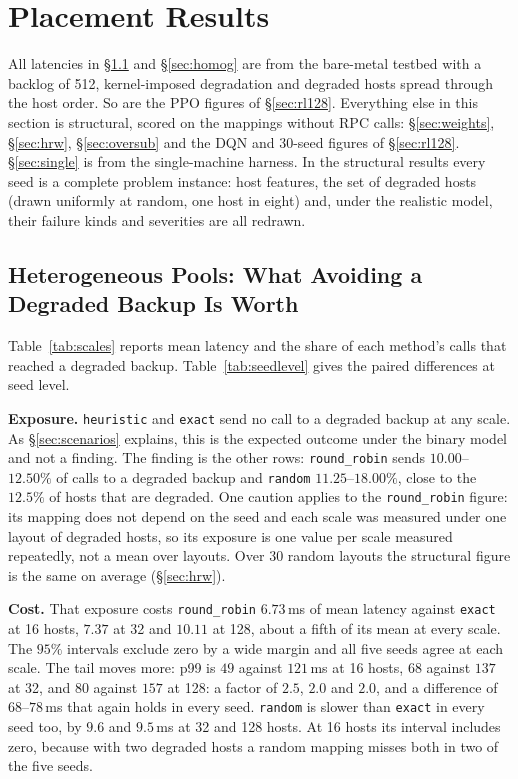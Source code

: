 \section{Placement Results}
\label{sec:results}

All latencies in \S\ref{sec:hetero} and \S\ref{sec:homog} are from the
bare-metal testbed with a backlog of 512, kernel-imposed degradation and
degraded hosts spread through the host order. So are the PPO figures of
\S\ref{sec:rl128}. Everything else in this section is structural, scored on
the mappings without RPC calls: \S\ref{sec:weights}, \S\ref{sec:hrw},
\S\ref{sec:oversub} and the DQN and 30-seed figures of \S\ref{sec:rl128}.
\S\ref{sec:single} is from the single-machine harness. In the structural
results every seed is a complete problem instance: host features, the set of
degraded hosts (drawn uniformly at random, one host in eight) and, under the
realistic model, their failure kinds and severities are all redrawn.

\subsection{Heterogeneous Pools: What Avoiding a Degraded Backup Is Worth}
\label{sec:hetero}





Table~\ref{tab:scales} reports mean latency and the share of each method's calls
that reached a degraded backup. Table~\ref{tab:seedlevel} gives the paired
differences at seed level.

\textbf{Exposure.} \texttt{heuristic} and \texttt{exact} send no call to a
degraded backup at any scale. As \S\ref{sec:scenarios} explains, this is the
expected outcome under the binary model and not a finding. The finding is the
other rows: \texttt{round\_robin} sends $10.00$--$12.50\%$ of calls to a
degraded backup and \texttt{random} $11.25$--$18.00\%$, close to the $12.5\%$ of
hosts that are degraded. One caution applies to the \texttt{round\_robin}
figure: its mapping does not depend on the seed and each scale was measured
under one layout of degraded hosts, so its exposure is one value per scale
measured repeatedly, not a mean over layouts. Over 30 random layouts the
structural figure is the same on average (\S\ref{sec:hrw}).

\textbf{Cost.} That exposure costs \texttt{round\_robin} $6.73$\,ms of mean
latency against \texttt{exact} at 16 hosts, $7.37$ at 32 and $10.11$ at 128,
about a fifth of its mean at every scale. The $95\%$ intervals exclude zero by a
wide margin and all five seeds agree at each scale. The tail moves more: p99 is
$49$ against $121$\,ms at 16 hosts, $68$ against $137$ at 32, and $80$ against
$157$ at 128: a factor of $2.5$, $2.0$ and $2.0$, and a difference of
$68$--$78$\,ms that again holds in every seed.
\texttt{random} is slower than \texttt{exact} in every seed too, by $9.6$ and $9.5$\,ms
at 32 and 128 hosts. At 16 hosts its interval includes zero, because with two
degraded hosts a random mapping misses both in two of the five seeds.

